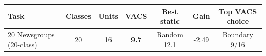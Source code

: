 \begin{tabular}{lcccccc}
\toprule
Task & Classes & Units & VACS & Best static & Gain & Top VACS choice \\
\midrule
20 Newsgroups (20-class) & 20 & 16 & \textbf{9.7} & Random 12.1 & -2.49 & Boundary 9/16 \\
\bottomrule
\end{tabular}
